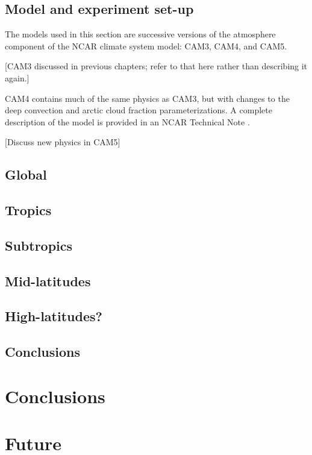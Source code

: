 \section{Model and experiment set-up}
The models used in this section are successive versions of the atmosphere component of the NCAR climate system model: CAM3, CAM4, and CAM5. 

[CAM3 discussed in previous chapters; refer to that here rather than describing it again.]

CAM4 contains much of the same physics as CAM3, but with changes to the deep convection and arctic cloud fraction parameterizations. A complete description of the model is provided in an NCAR Technical Note \cite{cam4_description}.

[Discuss new physics in CAM5]

\section{Global}
\section{Tropics}
\section{Subtropics}
\section{Mid-latitudes}
\section{High-latitudes?}
\section{Conclusions}

\chapter{Conclusions}

\chapter{Future}

%
